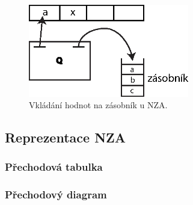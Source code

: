 \documentclass[10pt, a4paper, titlepage]{article}
\theoremstyle{note}
\begin{document}
\begin{figure}[ht]
\centering\includegraphics[width=7cm]{zasobnikovy-2.eps}
\caption{Vkládání hodnot na zásobník u NZA.}
\end{figure}

\subsection{Reprezentace NZA}

\subsubsection{Přechodová tabulka}
\subsubsection{Přechodový diagram}


\renewcommand{\indexcolumns}{3}
\printindex
\end{document}
